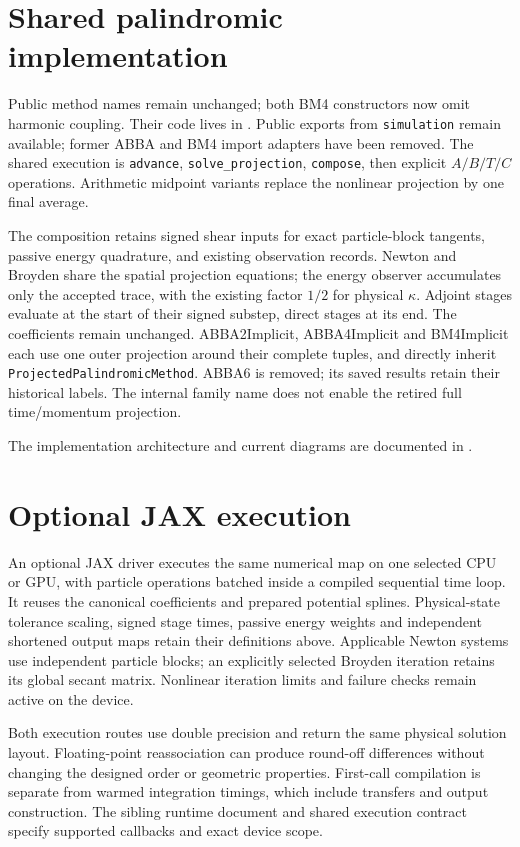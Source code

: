 \documentclass[11pt,a4paper]{article}
\begin{document}
\section{Shared palindromic implementation}
Public method names remain unchanged; both BM4 constructors now omit harmonic
coupling. Their code
lives in . Public exports from \texttt{simulation}
remain available; former ABBA and BM4 import adapters have been removed.
The shared execution is
\texttt{advance}, \texttt{solve\_projection}, \texttt{compose}, then
explicit $A/B/T/C$ operations. Arithmetic midpoint variants
replace the nonlinear projection by one final average.

The composition retains signed shear inputs for exact particle-block tangents,
passive energy quadrature, and existing observation records. Newton and Broyden
share the spatial projection equations; the energy observer accumulates only the
accepted trace, with the existing factor $1/2$ for physical $\kappa$.
Adjoint stages evaluate at the start of their signed substep, direct stages at
its end. The coefficients remain unchanged. ABBA2Implicit, ABBA4Implicit
and BM4Implicit each use one outer projection around their complete tuples,
and directly inherit \texttt{ProjectedPalindromicMethod}. ABBA6 is removed;
its saved results retain their historical labels. The internal family name
does not enable the retired full time/momentum projection.

The implementation architecture and current diagrams are documented in
.


\section{Optional JAX execution}

An optional JAX driver executes the same numerical map on one selected CPU
or GPU, with particle operations batched inside a compiled sequential time
loop. It reuses the canonical coefficients and prepared potential splines.
Physical-state tolerance scaling, signed stage times, passive energy weights
and independent shortened output maps retain their definitions above.
Applicable Newton systems use independent particle blocks; an explicitly
selected Broyden iteration retains its global secant matrix. Nonlinear
iteration limits and failure checks remain active on the device.

Both execution routes use double precision and return the same physical
solution layout. Floating-point reassociation can produce round-off
differences without changing the designed order or geometric properties.
First-call compilation is separate from warmed integration timings, which
include transfers and output construction. The sibling runtime document and
shared execution contract specify supported callbacks and exact device scope.
\end{document}
